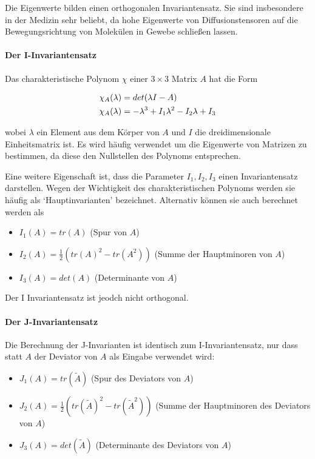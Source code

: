 \documentclass[a4paper,fontsize=12pt,toc=bib,halfparskip]{scrartcl}
\begin{document}
Die Eigenwerte bilden einen orthogonalen Invariantensatz. Sie sind insbesondere in der Medizin sehr beliebt, da hohe Eigenwerte von Diffusionstensoren auf die Bewegungsrichtung von Molek\"ulen in Gewebe schlie{\ss}en lassen.

\paragraph{Der I-Invariantensatz}
Das charakteristische Polynom $\chi$ einer $3\times3$ Matrix $A$ hat die Form

\begin{equation}
	\centering
	\begin{split}
	&\chi_A(\lambda) = det(\lambda I - A)\\
	&\chi_A(\lambda) = -\lambda^3 + I_1\lambda^2 - I_2\lambda + I_3
	\end{split}
\end{equation}

wobei $\lambda$ ein Element aus dem K\"orper von $A$ und $I$ die dreidimensionale Einheitsmatrix ist. Es wird h\"aufig verwendet um die Eigenwerte von Matrizen zu bestimmen, da diese den Nullstellen des Polynoms entsprechen.

Eine weitere Eigenschaft ist, dass die Parameter $I_1, I_2, I_3$ einen Invariantensatz darstellen. Wegen der Wichtigkeit des charakteristischen Polynoms werden sie h\"aufig als `Hauptinvarianten' bezeichnet. Alternativ k\"onnen sie auch berechnet werden als

\begin{itemize}
	\item $I_1(A) = tr(A)$ (Spur von $A$)
	\item $I_2(A) = \frac{1}{2}(tr(A)^2 - tr(A^2))$ (Summe der Hauptminoren von $A$)
	\item $I_3(A) = det(A)$ (Determinante von $A$)
\end{itemize}
Der I Invariantensatz ist jeodch nicht orthogonal.

\paragraph{Der J-Invariantensatz}
 Die Berechnung der J-Invarianten ist identisch zum I-Invariantensatz, nur dass statt $A$ der Deviator von $A$ als Eingabe verwendet wird:

\begin{itemize}
	\item $J_1(A) = tr(\tilde{A})$ (Spur des Deviators von $A$)
	\item $J_2(A) = \frac{1}{2}(tr(\tilde{A})^2 - tr(\tilde{A}^2))$ (Summe der Hauptminoren des Deviators von $A$)
\item $J_3(A) = det(\tilde{A})$ (Determinante des Deviators von $A$)
\end{itemize}
\end{document}
